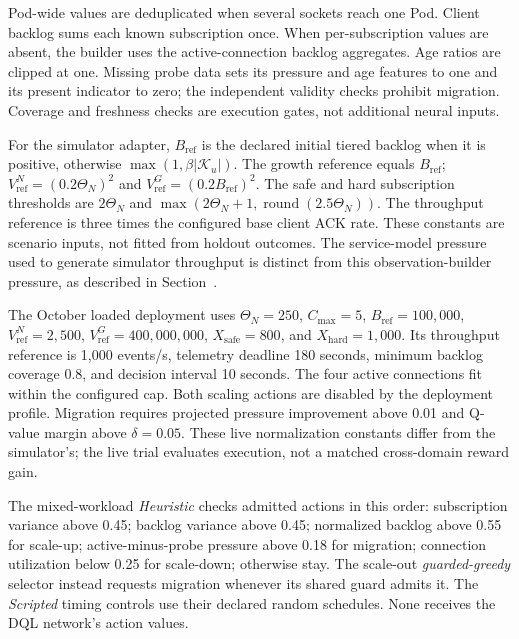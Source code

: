 Pod-wide values are deduplicated when several sockets reach one Pod.
Client backlog sums each known subscription once. When per-subscription
values are absent, the builder uses the active-connection backlog aggregates.
Age ratios are clipped at one. Missing probe data sets its pressure and age
features to one and its present indicator to zero; the independent validity
checks prohibit migration. Coverage and freshness checks are execution gates,
not additional neural inputs.

For the simulator adapter, $B_{\mathrm{ref}}$ is the declared initial tiered
backlog when it is positive, otherwise $\max(1,\beta|\mathcal K_u|)$.
The growth reference equals $B_{\mathrm{ref}}$;
$V^N_{\mathrm{ref}}=(0.2\Theta_N)^2$ and
$V^G_{\mathrm{ref}}=(0.2B_{\mathrm{ref}})^2$.
The safe and hard subscription thresholds are $2\Theta_N$ and
$\max(2\Theta_N+1,\operatorname{round}(2.5\Theta_N))$.
The throughput reference is three times the configured base client ACK rate.
These constants are scenario inputs, not fitted from holdout outcomes.
The service-model pressure used to generate simulator throughput is distinct
from this observation-builder pressure, as described in
Section~.

The October loaded deployment uses $\Theta_N=250$, $C_{\max}=5$,
$B_{\mathrm{ref}}=100{,}000$, $V^N_{\mathrm{ref}}=2{,}500$,
$V^G_{\mathrm{ref}}=400{,}000{,}000$, $X_{\mathrm{safe}}=800$, and
$X_{\mathrm{hard}}=1{,}000$. Its throughput reference is 1,000 events/s,
telemetry deadline 180 seconds, minimum backlog coverage 0.8, and decision
interval 10 seconds. The four active connections fit within the configured
cap. Both scaling actions are disabled by the deployment profile. Migration
requires projected pressure improvement above 0.01 and Q-value margin above
$\delta=0.05$. These live normalization constants differ from the simulator's;
the live trial evaluates execution, not a matched cross-domain reward gain.

The mixed-workload \emph{Heuristic} checks admitted actions in this order:
subscription variance above 0.45; backlog variance above 0.45; normalized
backlog above 0.55 for scale-up; active-minus-probe pressure above 0.18 for
migration; connection utilization below 0.25 for scale-down; otherwise stay.
The scale-out \emph{guarded-greedy} selector instead requests migration whenever
its shared guard admits it. The \emph{Scripted} timing controls use their
declared random schedules. None receives the DQL network's action values.
